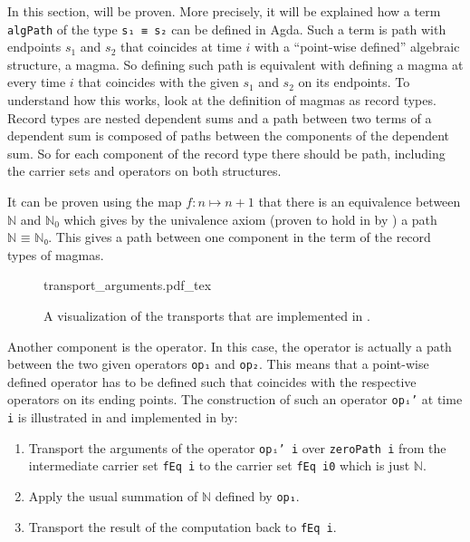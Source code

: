 \documentclass[12pt,a4paper,twoside,xetex]{book} %
\newcommand{\incfig}[1]{%
    \def\svgwidth{0.6\columnwidth}
    {#1.pdf_tex}
}
\begin{document}
In this section,  will be proven. More precisely, it will be explained how a term \texttt{algPath} of the type \texttt{s₁ ≡ s₂} can be defined in Agda. Such a term is path with endpoints $s_1$ and $s_2$ that coincides at time $i$ with a ``point-wise 
defined'' algebraic structure, a magma. So defining such path is equivalent 
with defining a magma at every time $i$ that coincides with the given $s_1$ and 
$s_2$ on its endpoints. To understand how this works, look at the definition of 
magmas as record types. Record types are nested dependent sums and a path 
between two terms of a dependent sum is composed of paths between the 
components of the dependent sum. So for each component of the record type there 
should be path, including the carrier sets and operators on both structures. 

It can be proven using the map $f: n \mapsto n + 1$ that there is an 
equivalence between $\mathbb{N}$ and $\mathbb{N}_0$ which gives by the 
univalence axiom (proven to hold in  by ) a 
path $\texttt{ℕ ≡ ℕ₀}$. This gives a path between one component in the term of 
the record types of magmas. 

\begin{figure}\label{transpop}
\centering
\incfig{transport_arguments}
\caption{A visualization of the transports that are implemented in .}
\end{figure}

Another component is the operator. In this case, the operator is actually a 
path between the two given operators \texttt{op₁} and \texttt{op₂}. This means that a point-wise defined 
operator has to be defined such that coincides with the respective operators on its ending points. The construction of such an operator \texttt{opᵢ'} at time \texttt{i} is illustrated in  and implemented in  by:

\begin{enumerate}
\item Transport the arguments of the operator \texttt{opᵢ' i} over \texttt{zeroPath i} from the intermediate carrier set \texttt{fEq i} to the carrier set \texttt{fEq i0} which is just $\mathbb{N}$. 
\item Apply the usual summation of $\mathbb{N}$ defined by \texttt{op₁}.
\item Transport the result of the computation back to \texttt{fEq i}.
\end{enumerate}
\end{document}
